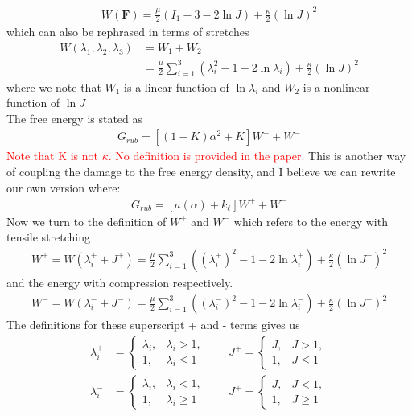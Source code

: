 \documentclass[12pt,3p]{article}
\numberwithin{equation}{section}
\begin{document}
\begin{align*}
W (\mathbf{F}) = \frac{\mu}{2} (I_1 -3 - 2 \ln J) + \frac{\kappa}{2} (\ln J)^2
\end{align*}
which can also be rephrased in terms of stretches
\begin{align*}
W(\lambda_1, \lambda_2, \lambda_3) &= W_1 + W_2 \\
		&= \frac{\mu}{2} \sum_{i = 1}^3 (\lambda_i^2 - 1 - 2 \ln \lambda_i) + \frac{\kappa}{2} (\ln J)^2
\end{align*}
where we note that $W_1$ is a linear function of $\ln \lambda_i$ and $W_2$ is a nonlinear function of $\ln J$ \\
The free energy is stated as 
\begin{align*}
G_{rub} = [(1- K) \alpha^2 + K] W^+ + W^-
\end{align*}
\textcolor{red}{Note that K is not $\kappa$. No definition is provided in the paper.} This is another way of coupling the damage to the free energy density, and I believe we can rewrite our own version where:
\begin{align*}
G_{rub} = [a (\alpha) + k_{\ell}] W^+ + W^-
\end{align*}
Now we turn to the definition of $W^+$ and $W^-$ which refers to the energy with tensile stretching
\begin{align*}
W^+ = W(\lambda_i^+ + J^+) = \frac{\mu}{2} \sum_{i = 1}^3 ( (\lambda_i^+)^2 - 1 - 2 \ln \lambda_i^+) + \frac{\kappa}{2} (\ln J^+)^2
\end{align*}
and the energy with compression respectively.
\begin{align*}
W^- = W(\lambda_i^- + J^-) = \frac{\mu}{2} \sum_{i = 1}^3 ( (\lambda_i^-)^2 - 1 - 2 \ln \lambda_i^-) + \frac{\kappa}{2} (\ln J^-)^2
\end{align*}
The definitions for these superscript + and - terms gives us  
\begin{align*}
\lambda_i^+ &=
\begin{cases}
	\lambda_i, & \lambda_i > 1, \\
	1, & \lambda_i \leq 1	
\end{cases} \quad \quad 
J^+ =
\begin{cases}
	J, & J > 1, \\
	1, & J \leq 1	
\end{cases} \\
\lambda_i^- &=
\begin{cases}
	\lambda_i, & \lambda_i < 1, \\
	1, & \lambda_i \geq 1	
\end{cases} \quad \quad 
J^+ =
\begin{cases}
	J, & J < 1, \\
	1, & J \geq 1	
\end{cases} \\
\end{align*}
\end{document}
